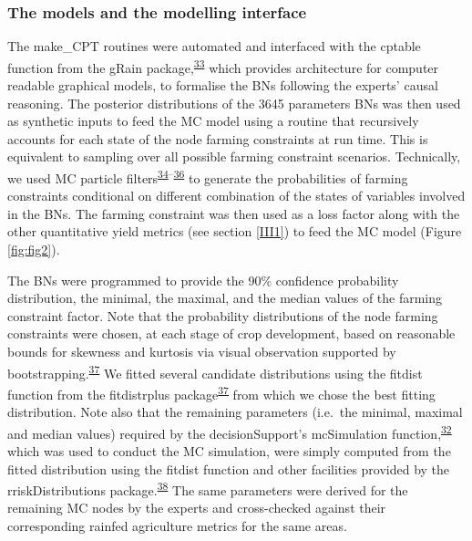 \documentclass[12pt,oneside]{article}
\begin{document}
\hypertarget{III32}{%
\subsubsection{The models and the modelling interface}\label{III32}}

The make\_CPT routines were automated and interfaced with the cptable function from the gRain package,\textsuperscript{\protect\hyperlink{ref-Hojsgaard_2012}{33}} which provides architecture for computer readable graphical models, to formalise the BNs following the experts' causal reasoning. The posterior distributions of the 3645 parameters BNs was then used as synthetic inputs to feed the MC model using a routine that recursively accounts for each state of the node farming constraints at run time. This is equivalent to sampling over all possible farming constraint scenarios. Technically, we used MC particle filters\textsuperscript{\protect\hyperlink{ref-Kitagawa_2016}{34}--\protect\hyperlink{ref-Scutari_2010}{36}} to generate the probabilities of farming constraints conditional on different combination of the states of variables involved in the BNs. The farming constraint was then used as a loss factor along with the other quantitative yield metrics (see section \ref{III1}) to feed the MC model (Figure \ref{fig:fig2}).

The BNs were programmed to provide the 90\% confidence probability distribution, the minimal, the maximal, and the median values of the farming constraint factor. Note that the probability distributions of the node farming constraints were chosen, at each stage of crop development, based on reasonable bounds for skewness and kurtosis via visual observation supported by bootstrapping.\textsuperscript{\protect\hyperlink{ref-Delignette-Muller_and_Dutang_2015}{37}} We fitted several candidate distributions using the fitdist function from the fitdistrplus package\textsuperscript{\protect\hyperlink{ref-Delignette-Muller_and_Dutang_2015}{37}} from which we chose the best fitting distribution. Note also that the remaining parameters (i.e.~the minimal, maximal and median values) required by the decisionSupport's mcSimulation function,\textsuperscript{\protect\hyperlink{ref-Luedeling_and_Goehring_2018}{32}} which was used to conduct the MC simulation, were simply computed from the fitted distribution using the fitdist function and other facilities provided by the rriskDistributions package.\textsuperscript{\protect\hyperlink{ref-Belgorodski_et_al_2017}{38}} The same parameters were derived for the remaining MC nodes by the experts and cross-checked against their corresponding rainfed agriculture metrics for the same areas.
\end{document}
